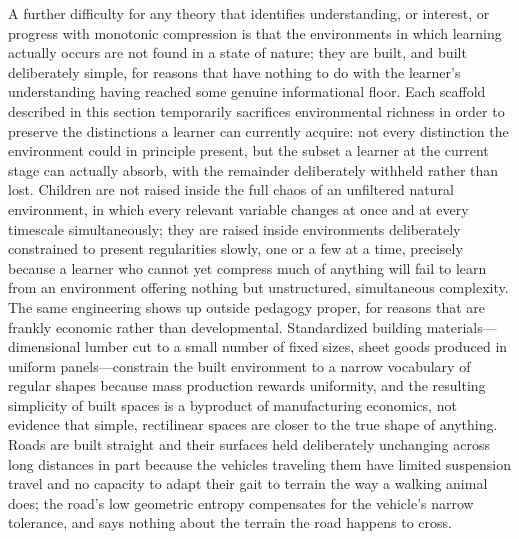 \documentclass[11pt]{article}
\theoremstyle{plain}
\begin{document}
A further difficulty for any theory that identifies understanding, or interest, or progress with monotonic compression is that the environments in which learning actually occurs are not found in a state of nature; they are built, and built deliberately simple, for reasons that have nothing to do with the learner's understanding having reached some genuine informational floor. Each scaffold described in this section temporarily sacrifices environmental richness in order to preserve the distinctions a learner can currently acquire: not every distinction the environment could in principle present, but the subset a learner at the current stage can actually absorb, with the remainder deliberately withheld rather than lost. Children are not raised inside the full chaos of an unfiltered natural environment, in which every relevant variable changes at once and at every timescale simultaneously; they are raised inside environments deliberately constrained to present regularities slowly, one or a few at a time, precisely because a learner who cannot yet compress much of anything will fail to learn from an environment offering nothing but unstructured, simultaneous complexity. The same engineering shows up outside pedagogy proper, for reasons that are frankly economic rather than developmental. Standardized building materials---dimensional lumber cut to a small number of fixed sizes, sheet goods produced in uniform panels---constrain the built environment to a narrow vocabulary of regular shapes because mass production rewards uniformity, and the resulting simplicity of built spaces is a byproduct of manufacturing economics, not evidence that simple, rectilinear spaces are closer to the true shape of anything. Roads are built straight and their surfaces held deliberately unchanging across long distances in part because the vehicles traveling them have limited suspension travel and no capacity to adapt their gait to terrain the way a walking animal does; the road's low geometric entropy compensates for the vehicle's narrow tolerance, and says nothing about the terrain the road happens to cross.
\end{document}
